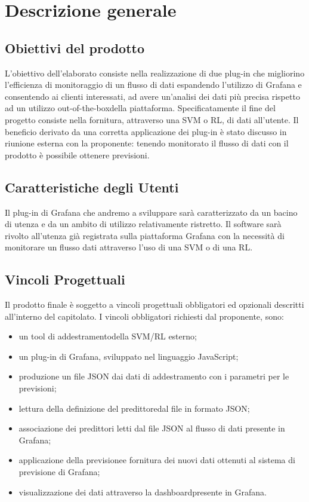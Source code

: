 \section{Descrizione generale}
   
	\subsection{Obiettivi del prodotto}
	L’obiettivo dell’elaborato consiste nella realizzazione di due plug-in che migliorino l’efficienza di monitoraggio di un flusso di dati espandendo l’utilizzo di Grafana e consentendo ai clienti  interessati, ad avere un’analisi dei dati più precisa rispetto ad un utilizzo out-of-the-box\glo della piattaforma. Specificatamente il fine del progetto consiste nella fornitura, attraverso una SVM o RL, di dati all’utente. Il beneficio derivato da una corretta applicazione dei plug-in è stato discusso in riunione esterna con la proponente: tenendo monitorato il flusso di dati con il prodotto è possibile ottenere previsioni. 
	\subsection{Caratteristiche degli Utenti}
	Il plug-in di Grafana che andremo a sviluppare sarà caratterizzato da un bacino di utenza e da un ambito di utilizzo relativamente ristretto.
Il software sarà rivolto all’utenza già registrata sulla piattaforma Grafana con la necessità di monitorare un flusso dati attraverso l’uso di una SVM o di una RL.

	 \subsection{Vincoli Progettuali}
	 Il prodotto finale è soggetto a vincoli progettuali obbligatori ed opzionali descritti all’interno del capitolato. I vincoli obbligatori richiesti dal proponente, sono:

	 	\begin{itemize}
			\item un tool di addestramento\glo della SVM/RL esterno;
	 		\item un plug-in di Grafana, sviluppato nel linguaggio JavaScript;
	 		\item produzione un file JSON dai dati di addestramento con i parametri per le previsioni;
			\item lettura della definizione del predittore\glo dal file in formato JSON;
			\item associazione dei predittori letti dal file JSON al flusso di dati presente in Grafana; 
			\item applicazione della previsione\glo e fornitura dei nuovi dati ottenuti al sistema di previsione di Grafana;
			\item visualizzazione dei dati attraverso la dashboard\glo presente in Grafana.
	 	\end{itemize}

